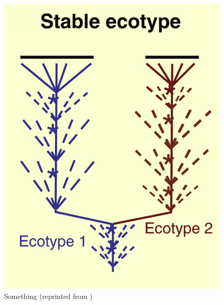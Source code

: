 \begin{figure}[h!]
 \caption{Something (reprinted from \protect\cite{cohan2008origins}) }
 \centering
 \label{fig:StableTree}
 \includegraphics{images/StableTree-CH2}
\end{figure}

